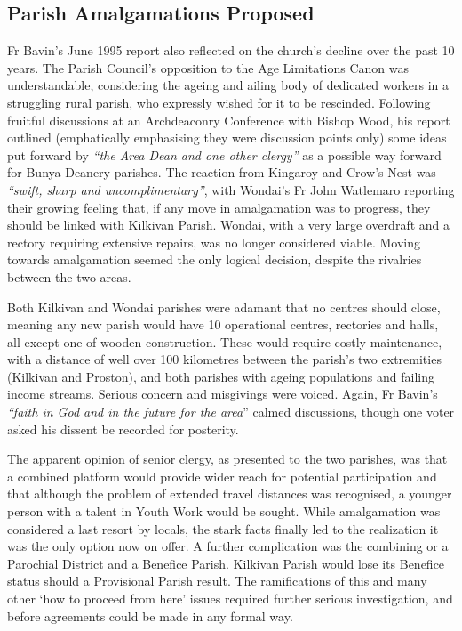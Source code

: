 \hypertarget{parish-amalgamations-proposed}{%
\subsection{Parish Amalgamations Proposed}\label{parish-amalgamations-proposed}}

Fr Bavin's June 1995 report also reflected on the church's decline over the past 10 years. The Parish Council's opposition to the Age Limitations Canon was understandable, considering the ageing and ailing body of dedicated workers in a struggling rural parish, who expressly wished for it to be rescinded. Following fruitful discussions at an Archdeaconry Conference with Bishop Wood, his report outlined (emphatically emphasising they were discussion points only) some ideas put forward by \emph{``the Area Dean and one other clergy''} as a possible way forward for Bunya Deanery parishes. The reaction from Kingaroy and Crow's Nest was \emph{``swift, sharp and uncomplimentary''}, with Wondai's Fr John Watlemaro reporting their growing feeling that, if any move in amalgamation was to progress, they should be linked with Kilkivan Parish. Wondai, with a very large overdraft and a rectory requiring extensive repairs, was no longer considered viable. Moving towards amalgamation seemed the only logical decision, despite the rivalries between the two areas.

Both Kilkivan and Wondai parishes were adamant that no centres should close, meaning any new parish would have 10 operational centres, rectories and halls, all except one of wooden construction. These would require costly maintenance, with a distance of well over 100 kilometres between the parish's two extremities (Kilkivan and Proston), and both parishes with ageing populations and failing income streams. Serious concern and misgivings were voiced. Again, Fr Bavin's \emph{``faith in God and in the future for the area}'' calmed discussions, though one voter asked his dissent be recorded for posterity.

The apparent opinion of senior clergy, as presented to the two parishes, was that a combined platform would provide wider reach for potential participation and that although the problem of extended travel distances was recognised, a younger person with a talent in Youth Work would be sought. While amalgamation was considered a last resort by locals, the stark facts finally led to the realization it was the only option now on offer. A further complication was the combining or a Parochial District and a Benefice Parish. Kilkivan Parish would lose its Benefice status should a Provisional Parish result. The ramifications of this and many other `how to proceed from here' issues required further serious investigation, and before agreements could be made in any formal way.

